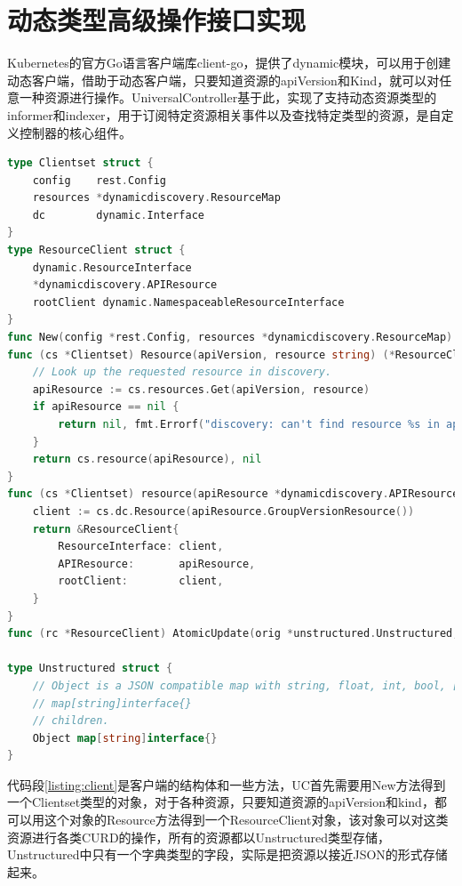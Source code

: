 \documentclass[macfonts,master]{njuthesis}
\begin{document}
\section{动态类型高级操作接口实现}

Kubernetes的官方Go语言客户端库client-go，提供了dynamic模块，可以用于创建动态客户端，借助于动态客户端，只要知道资源的apiVersion和Kind，就可以对任意一种资源进行操作。UniversalController基于此，实现了支持动态资源类型的informer和indexer，用于订阅特定资源相关事件以及查找特定类型的资源，是自定义控制器的核心组件。

\begin{lstlisting}[language=Go,caption=客户端实现,label=listing:client]
type Clientset struct {
	config    rest.Config
	resources *dynamicdiscovery.ResourceMap
	dc        dynamic.Interface
}
type ResourceClient struct {
	dynamic.ResourceInterface
	*dynamicdiscovery.APIResource
	rootClient dynamic.NamespaceableResourceInterface
}
func New(config *rest.Config, resources *dynamicdiscovery.ResourceMap) (*Clientset, error)
func (cs *Clientset) Resource(apiVersion, resource string) (*ResourceClient, error) {
	// Look up the requested resource in discovery.
	apiResource := cs.resources.Get(apiVersion, resource)
	if apiResource == nil {
		return nil, fmt.Errorf("discovery: can't find resource %s in apiVersion %s", resource, apiVersion)
	}
	return cs.resource(apiResource), nil
}
func (cs *Clientset) resource(apiResource *dynamicdiscovery.APIResource) *ResourceClient {
	client := cs.dc.Resource(apiResource.GroupVersionResource())
	return &ResourceClient{
		ResourceInterface: client,
		APIResource:       apiResource,
		rootClient:        client,
	}
}
func (rc *ResourceClient) AtomicUpdate(orig *unstructured.Unstructured, update func(obj *unstructured.Unstructured) bool) (result *unstructured.Unstructured, err error)

type Unstructured struct {
	// Object is a JSON compatible map with string, float, int, bool, []interface{}, or
	// map[string]interface{}
	// children.
	Object map[string]interface{}
}
\end{lstlisting}

代码段\ref{listing:client}是客户端的结构体和一些方法，UC首先需要用New方法得到一个Clientset类型的对象，对于各种资源，只要知道资源的apiVersion和kind，都可以用这个对象的Resource方法得到一个ResourceClient对象，该对象可以对这类资源进行各类CURD的操作，所有的资源都以Unstructured类型存储，Unstructured中只有一个字典类型的字段，实际是把资源以接近JSON的形式存储起来。
\end{document}
